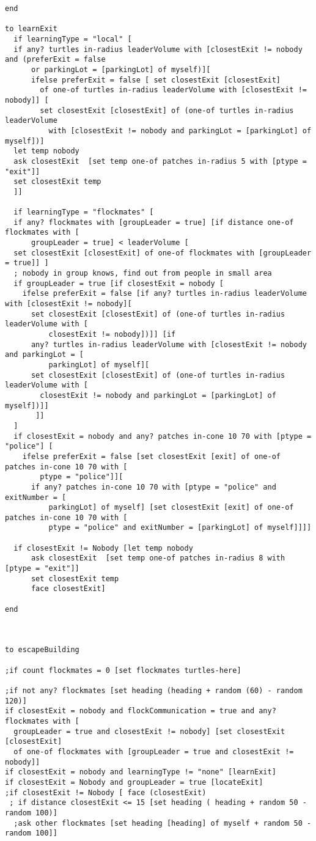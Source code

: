 \documentclass{article}
\begin{document}
\begin{lstlisting}
end 

to learnExit 
  if learningType = "local" [
  if any? turtles in-radius leaderVolume with [closestExit != nobody and (preferExit = false 
      or parkingLot = [parkingLot] of myself)][
      ifelse preferExit = false [ set closestExit [closestExit] 
        of one-of turtles in-radius leaderVolume with [closestExit != nobody]] [
        set closestExit [closestExit] of (one-of turtles in-radius leaderVolume 
          with [closestExit != nobody and parkingLot = [parkingLot] of myself])]
  let temp nobody
  ask closestExit  [set temp one-of patches in-radius 5 with [ptype = "exit"]]
  set closestExit temp
  ]]
  
  if learningType = "flockmates" [
  if any? flockmates with [groupLeader = true] [if distance one-of flockmates with [
      groupLeader = true] < leaderVolume [
  set closestExit [closestExit] of one-of flockmates with [groupLeader = true]] ]
  ; nobody in group knows, find out from people in small area
  if groupLeader = true [if closestExit = nobody [
    ifelse preferExit = false [if any? turtles in-radius leaderVolume with [closestExit != nobody][ 
      set closestExit [closestExit] of (one-of turtles in-radius leaderVolume with [
          closestExit != nobody])]] [if
      any? turtles in-radius leaderVolume with [closestExit != nobody and parkingLot = [
          parkingLot] of myself][
      set closestExit [closestExit] of (one-of turtles in-radius leaderVolume with [
        closestExit != nobody and parkingLot = [parkingLot] of myself])]]
       ]]
  ]
  if closestExit = nobody and any? patches in-cone 10 70 with [ptype = "police"] [
    ifelse preferExit = false [set closestExit [exit] of one-of patches in-cone 10 70 with [
        ptype = "police"]][
      if any? patches in-cone 10 70 with [ptype = "police" and exitNumber = [
          parkingLot] of myself] [set closestExit [exit] of one-of patches in-cone 10 70 with [
          ptype = "police" and exitNumber = [parkingLot] of myself]]]]
  
  if closestExit != Nobody [let temp nobody
      ask closestExit  [set temp one-of patches in-radius 8 with [ptype = "exit"]]
      set closestExit temp 
      face closestExit]  
  
end


 
to escapeBuilding

;if count flockmates = 0 [set flockmates turtles-here]

;if not any? flockmates [set heading (heading + random (60) - random 120)]
if closestExit = nobody and flockCommunication = true and any? flockmates with [
  groupLeader = true and closestExit != nobody] [set closestExit [closestExit] 
  of one-of flockmates with [groupLeader = true and closestExit != nobody]]
if closestExit = nobody and learningType != "none" [learnExit]
if closestExit = Nobody and groupLeader = true [locateExit] 
;if closestExit != Nobody [ face (closestExit) 
 ; if distance closestExit <= 15 [set heading ( heading + random 50 - random 100)] 
  ;ask other flockmates [set heading [heading] of myself + random 50 - random 100]]


\end{lstlisting}
\end{document}
